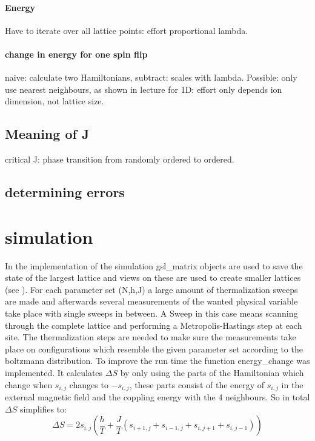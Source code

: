 \documentclass{scrartcl}
\begin{document}
\paragraph{Energy} Have to iterate over all lattice points: effort proportional lambda.

\paragraph{change in energy for one spin flip}
naive: calculate two Hamiltonians, subtract: scales with lambda. 
Possible: only use nearest neighbours, as shown in lecture for 1D: effort only depends ion dimension, not lattice size.

\subsection{Meaning of J} critical J: phase transition from randomly ordered to ordered.

\subsection{determining errors}

\section{simulation}
In the implementation of the simulation gsl\_matrix objects are used to save the state of the largest lattice and views on these are used to create smaller lattices (see \cite{gsldoc_mat}). For each parameter set (N,h,J) a large amount of thermalization sweeps are made and afterwards several measurements of the wanted physical variable take place with single sweeps in between. A Sweep in this case means scanning through the complete lattice and performing a Metropolis-Hastings step at each site. The thermalization steps are needed to make sure the measurements take place on configurations which resemble the given parameter set according to the boltzmann distribution. To improve the run time the function energy\_change was implemented. It calculates $\Delta S$ by only using the parts of the Hamiltonian which change when $s_{i,j}$ changes to $-s_{i,j}$, these parts consist of the energy of $s_{i,j}$ in the external magnetic field and the coppling energy with the 4 neighbours.
So in total $\Delta S$ simplifies to:
\begin{equation}
	\Delta S=2 s_{i,j}\left(\dfrac{h}{T}+\dfrac{J}{T}(s_{i+1,j}+s_{i-1,j}+s_{i,j+1}+s_{i,j-1})\right)
\end{equation}
\end{document}
